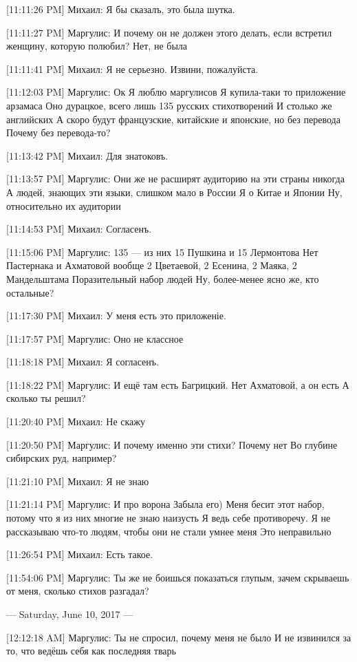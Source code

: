 \documentclass{article}
\begin{document}
[11:11:26 PM] Михаил:
Я бы сказалъ, это была шутка.

[11:11:27 PM] Маргулис:
И почему он не должен этого делать, если встретил женщину, которую полюбил?
 Нет, не была

[11:11:41 PM] Михаил:
Я не серьезно.
 Извини, пожалуйста.

[11:12:03 PM] Маргулис:
Ок
 Я люблю маргулисов
 Я купила-таки то приложение арзамаса
 Оно дурацкое, всего лишь 135 русских стихотворений
 И столько же английских
 А скоро будут французские, китайские и японские, но без перевода
 Почему без перевода-то?

[11:13:42 PM] Михаил:
Для знатоковъ.

[11:13:57 PM] Маргулис:
Они же не расширят аудиторию на эти страны никогда
 А людей, знающих эти языки, слишком мало в России
 Я о Китае и Японии
 Ну, относительно их аудитории

[11:14:53 PM] Михаил:
Согласенъ.

[11:15:06 PM] Маргулис:
135 — из них 15 Пушкина и 15 Лермонтова
 Нет Пастернака и Ахматовой вообще
 2 Цветаевой, 2 Есенина, 2 Маяка, 2 Мандельштама
 Поразительный набор людей
 Ну, более-менее ясно же, кто остальные?

[11:17:30 PM] Михаил:
У меня есть это приложеніе.

[11:17:57 PM] Маргулис:
Оно не классное

[11:18:18 PM] Михаил:
Я согласенъ.

[11:18:22 PM] Маргулис:
И ещё там есть Багрицкий. Нет Ахматовой, а он есть
 А сколько ты решил?

[11:20:40 PM] Михаил:
Не скажу

[11:20:50 PM] Маргулис:
И почему именно эти стихи? Почему нет Во глубине сибирских руд, например?

[11:21:10 PM] Михаил:
Я не знаю

[11:21:14 PM] Маргулис:
И про ворона
 Забыла его)
 Меня бесит этот набор, потому что я из них многие не знаю наизусть
 Я ведь себе противоречу. Я не рассказываю что-то людям, чтобы они не стали умнее меня
 Это неправильно

[11:26:54 PM] Михаил:
Есть такое.

[11:54:06 PM] Маргулис:
Ты же не боишься показаться глупым, зачем скрываешь от меня, сколько стихов разгадал?

--- Saturday, June 10, 2017 ---

[12:12:18 AM] Маргулис:
Ты не спросил, почему меня не было
 И не извинился за то, что ведёшь себя как последняя тварь
\end{document}
